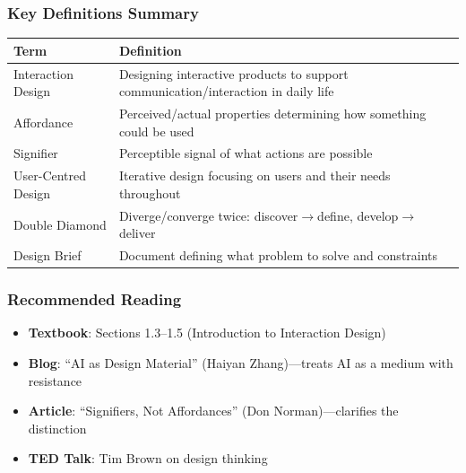 \subsubsection*{Key Definitions Summary}

\begin{center}
\renewcommand{\arraystretch}{1.3}
\begin{tabular}{@{} l p{9cm} @{}}
\toprule
\textbf{Term} & \textbf{Definition} \\
\midrule
Interaction Design & Designing interactive products to support communication/interaction in daily life \\
Affordance & Perceived/actual properties determining how something could be used \\
Signifier & Perceptible signal of what actions are possible \\
User-Centred Design & Iterative design focusing on users and their needs throughout \\
Double Diamond & Diverge/converge twice: discover$\to$define, develop$\to$deliver \\
Design Brief & Document defining what problem to solve and constraints \\
\bottomrule
\end{tabular}
\end{center}

\subsubsection*{Recommended Reading}
\begin{itemize}
  \item \textbf{Textbook}: Sections 1.3--1.5 (Introduction to Interaction Design)
  \item \textbf{Blog}: ``AI as Design Material'' (Haiyan Zhang)---treats AI as a medium with resistance
  \item \textbf{Article}: ``Signifiers, Not Affordances'' (Don Norman)---clarifies the distinction
  \item \textbf{TED Talk}: Tim Brown on design thinking
\end{itemize}


